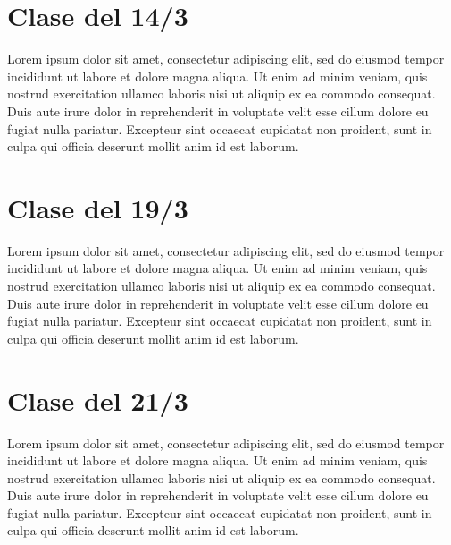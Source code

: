 \documentclass[12pt]{article}
\begin{document}
\newpage

\section*{Clase del 14/3}
Lorem ipsum dolor sit amet, consectetur adipiscing elit, sed do eiusmod tempor incididunt ut labore et dolore magna aliqua. Ut enim ad minim veniam, quis nostrud exercitation ullamco laboris nisi ut aliquip ex ea commodo consequat. Duis aute irure dolor in reprehenderit in voluptate velit esse cillum dolore eu fugiat nulla pariatur. Excepteur sint occaecat cupidatat non proident, sunt in culpa qui officia deserunt mollit anim id est laborum.
\newpage

\section*{Clase del 19/3}
Lorem ipsum dolor sit amet, consectetur adipiscing elit, sed do eiusmod tempor incididunt ut labore et dolore magna aliqua. Ut enim ad minim veniam, quis nostrud exercitation ullamco laboris nisi ut aliquip ex ea commodo consequat. Duis aute irure dolor in reprehenderit in voluptate velit esse cillum dolore eu fugiat nulla pariatur. Excepteur sint occaecat cupidatat non proident, sunt in culpa qui officia deserunt mollit anim id est laborum.
\newpage

\section*{Clase del 21/3}
Lorem ipsum dolor sit amet, consectetur adipiscing elit, sed do eiusmod tempor incididunt ut labore et dolore magna aliqua. Ut enim ad minim veniam, quis nostrud exercitation ullamco laboris nisi ut aliquip ex ea commodo consequat. Duis aute irure dolor in reprehenderit in voluptate velit esse cillum dolore eu fugiat nulla pariatur. Excepteur sint occaecat cupidatat non proident, sunt in culpa qui officia deserunt mollit anim id est laborum.
\end{document}
